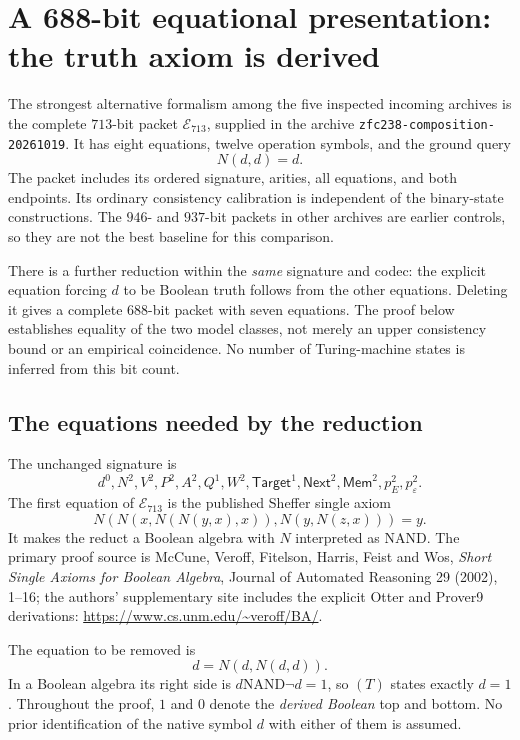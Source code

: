 \section{A 688-bit equational presentation: the truth axiom is derived}
\label{sec:e688}

The strongest alternative formalism among the five inspected incoming
archives is the complete $713$-bit packet $\mathcal E_{713}$, supplied in
the archive \texttt{zfc238-composition-20261019}. It has eight equations,
twelve operation symbols, and the ground query
\[
                 N(d,d)=d.
\]
The packet includes its ordered signature, arities, all equations, and both
endpoints. Its ordinary consistency calibration is independent of the
binary-state constructions. The $946$- and $937$-bit packets in other
archives are earlier controls, so they are not the best baseline for this
comparison.

There is a further reduction within the \emph{same} signature and codec:
the explicit equation forcing $d$ to be Boolean truth follows from the
other equations. Deleting it gives a complete $688$-bit packet with seven
equations. The proof below establishes equality of the two model classes,
not merely an upper consistency bound or an empirical coincidence.
No number of Turing-machine states is inferred from this bit count.

\subsection{The equations needed by the reduction}

The unchanged signature is
\[
 d^0,N^2,V^2,P^2,A^2,Q^1,W^2,
 \mathsf{Target}^1,\mathsf{Next}^2,\mathsf{Mem}^2,
 p_E^2,p_\varepsilon^2.
\]
The first equation of $\mathcal E_{713}$ is the published Sheffer single
axiom
\[
 N(N(x,N(N(y,x),x)),N(y,N(z,x)))=y.
 \tag{Sh1}
\]
It makes the reduct a Boolean algebra with $N$ interpreted as NAND.
The primary proof source is McCune, Veroff, Fitelson, Harris, Feist and Wos,
\emph{Short Single Axioms for Boolean Algebra}, Journal of Automated
Reasoning 29 (2002), 1--16; the authors' supplementary site includes
the explicit Otter and Prover9 derivations:
\url{https://www.cs.unm.edu/~veroff/BA/}.

The equation to be removed is
\[
                    d=N(d,N(d,d)).
                    \tag{T}
\]
In a Boolean algebra its right side is $d\mathbin{\mathrm{NAND}}\neg d=1$,
so $(T)$ states exactly $d=1$. Throughout the proof, $1$ and $0$ denote
the \emph{derived Boolean} top and bottom. No prior identification of the
native symbol $d$ with either of them is assumed.

